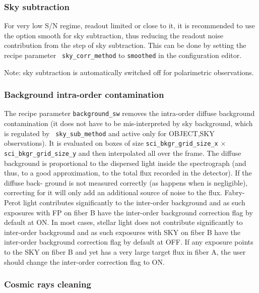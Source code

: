 \subsubsection{Sky subtraction}

For very low S/N regime, readout limited or close to it, it is
recommended to use the option smooth for sky subtraction, thus
reducing the readout noise contribution from the step of sky
subtraction. This can be done by setting the recipe parameter {\tt
  sky\_corr\_method} to {\tt smoothed} in the configuration editor.

Note: sky subtraction is automatically switched off for
polarimetric observations.

\subsubsection{Background intra-order contamination}

The recipe parameter {\tt background\_sw} removes the intra-order
diffuse background contamination (it does not have to be
mis-interpreted by sky background, which is regulated by {\tt
  sky\_sub\_method} and active only for OBJECT,SKY observations). It
is evaluated on boxes of size {\tt sci\_bkgr\_grid\_size\_x} $\times$
{\tt sci\_bkgr\_grid\_size\_y} and then interpolated all over the
frame. The diffuse background is proportional to the dispersed light
inside the spectrograph (and thus, to a good approximation, to the
total flux recorded in the detector). If the diffuse back- ground is
not measured correctly (as happens when is negligible), correcting for
it will only add an additional source of noise to the
flux. Fabry-Perot light contributes significantly to the inter-order
background and as such exposures with FP on fiber B have the
inter-order background correction flag by default at ON. In most
cases, stellar light does not contribute significantly to inter-order
background and as such exposures with SKY on fiber B have the
inter-order background correction flag by default at OFF. If any
exposure points to the SKY on fiber B and yet has a very large target
flux in fiber A, the user should change the inter-order correction
flag to ON.

\subsubsection{Cosmic rays cleaning}

